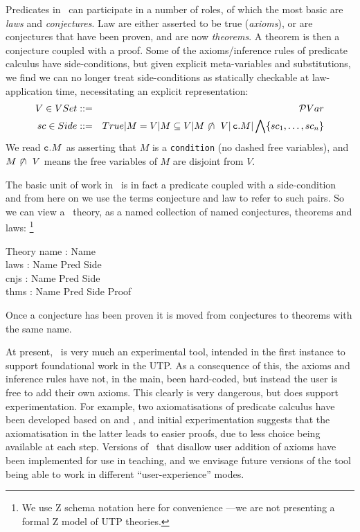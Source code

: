 Predicates in \STHN\ can participate in a number of roles,
of which the most basic are \emph{laws} and \emph{conjectures}.
Law are either asserted to be true (\emph{axioms}),
or are conjectures that have been proven, and are now \emph{theorems}.
A theorem is then a conjecture coupled with a proof.
Some of the axioms/inference rules of predicate calculus have side-conditions,
but given explicit meta-variables and substitutions,
we find we can no longer treat side-conditions as statically checkable
at law-application time, necessitating an explicit representation:
  \begin{eqnarray*}
     V \in VSet &::=& \mathcal{P} Var
  \\ sc \in Side &::=& True | M = V
                     | M \subseteq V
                     | M \mathrel{\not\!\cap~} V
                     | \mathop{\mathtt{c.\!}} M
                     | \bigwedge\{sc_1,\ldots,sc_n\}
  \end{eqnarray*}
We read $\mathop{\mathtt{c.\!}} M$ as asserting that $M$ is a \texttt{condition}
(no dashed free variables), and $M \mathrel{\not\!\cap~} V$ means the free variables of $M$
are disjoint from $V$.

The basic unit of work in \STHN\ is in fact a predicate coupled
with a side-condition and
from here on we use the terms conjecture and law to refer to such pairs.
So we can view a \STHN\ theory,
as a named collection of named conjectures, theorems and laws:%
\footnote{We use Z schema notation here for convenience%
---we are not presenting a formal Z model of UTP theories.
}
\begin{schema}{Theory}
   name : Name
\\ laws : Name \pfun Pred \times Side
\\ cnjs : Name \pfun Pred \times Side
\\ thms : Name \pfun Pred \times Side \times Proof
\end{schema}
Once a conjecture has been proven it is moved from conjectures
to theorems with the same name.

At present, \STHN\ is very much an experimental tool,
intended in the first instance to support foundational work in the UTP.
As a consequence of this, the axioms and inference rules have not,
in the main, been hard-coded,
but instead the user is free to add their own axioms.
This clearly is very dangerous, but does support experimentation.
For example, two axiomatisations of predicate calculus have been
developed based on \cite{Morgan1989} and \cite{Gries-Schneider94},
and initial experimentation suggests that the axiomatisation in the latter
leads to easier proofs, due to less choice being available at each step.
Versions of \STHN\ that disallow user addition of axioms have been
implemented for use in teaching, and we envisage future versions
of the tool being able to work in different ``user-experience'' modes.
